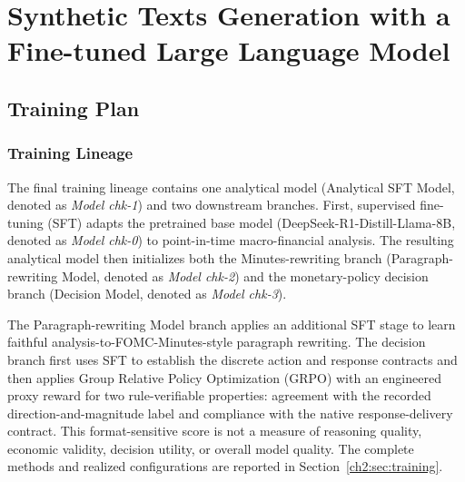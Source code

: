 \graphicspath{{Chapter2/Chapter2Figs/}{Chapter2/Chapter2Figs/}}
 
\chapter{Synthetic Texts Generation with a Fine-tuned Large Language Model}\label{ch:chapter:2}










\section{Training Plan}\label{ch2:sec:2-step-training}


\subsection*{Training Lineage}
The final training lineage contains one analytical model (Analytical SFT Model, denoted as \textit{Model chk-1}) and two downstream branches. First, supervised fine-tuning (SFT) adapts the pretrained base model (DeepSeek-R1-Distill-Llama-8B, denoted as \textit{Model chk-0}) to point-in-time macro-financial analysis. The resulting analytical model then initializes both the Minutes-rewriting branch (Paragraph-rewriting Model, denoted as \textit{Model chk-2}) and the monetary-policy decision branch (Decision Model, denoted as \textit{Model chk-3}).

The Paragraph-rewriting Model branch applies an additional SFT stage to learn faithful analysis-to-FOMC-Minutes-style paragraph rewriting. The decision branch first uses SFT to establish the discrete action and response contracts and then applies Group Relative Policy Optimization (GRPO) with an engineered proxy reward for two rule-verifiable properties: agreement with the recorded direction-and-magnitude label and compliance with the native response-delivery contract. This format-sensitive score is not a measure of reasoning quality, economic validity, decision utility, or overall model quality. The complete methods and realized configurations are reported in Section~\ref{ch2:sec:training}.




